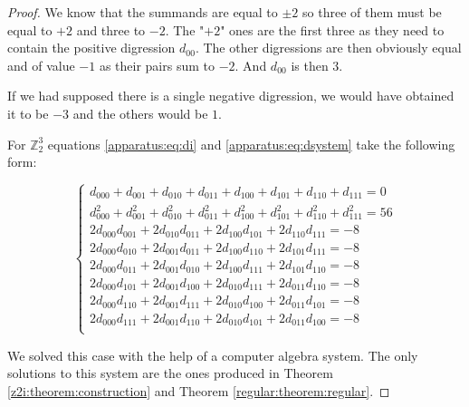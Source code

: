 \begin{proof}
    We know that the summands are equal to $\pm 2$ so three of them must be equal to $+2$ and three to $-2$. The "$+2$" ones are the first three as they need to contain the positive digression $d_{00}$. The other digressions are then obviously equal and of value $-1$ as their pairs sum to $-2$. And $d_{00}$ is then $3$.
    
    If we had supposed there is a single negative digression, we would have obtained it to be $-3$ and the others would be $1$.
    
    For $\mathbb Z_2^3$ equations \eqref{apparatus:eq:di} and \eqref{apparatus:eq:dsystem} take the following form:
    
    \begin{equation}
        \begin{cases}
            d_{000} + d_{001} + d_{010} + d_{011} + d_{100} + d_{101} + d_{110} + d_{111} = 0 \\
            d_{000}^2 + d_{001}^2 + d_{010}^2 + d_{011}^2 + d_{100}^2 + d_{101}^2 + d_{110}^2 + d_{111}^2 = 56 \\
            2 d_{000}d_{001} + 2 d_{010}d_{011} + 2 d_{100}d_{101} + 2 d_{110}d_{111} = -8 \\
            2 d_{000}d_{010} + 2 d_{001}d_{011} + 2 d_{100}d_{110} + 2 d_{101}d_{111} = -8 \\
            2 d_{000}d_{011} + 2 d_{001}d_{010} + 2 d_{100}d_{111} + 2 d_{101}d_{110} = -8 \\
            2 d_{000}d_{101} + 2 d_{001}d_{100} + 2 d_{010}d_{111} + 2 d_{011}d_{110} = -8 \\
            2 d_{000}d_{110} + 2 d_{001}d_{111} + 2 d_{010}d_{100} + 2 d_{011}d_{101} = -8 \\
            2 d_{000}d_{111} + 2 d_{001}d_{110} + 2 d_{010}d_{101} + 2 d_{011}d_{100} = -8 \\
        \end{cases}
    \end{equation}
    
    We solved this case with the help of a computer algebra system. The only solutions to this system are the ones produced in Theorem \ref{z2i:theorem:construction} and Theorem \ref{regular:theorem:regular}.
\end{proof}


